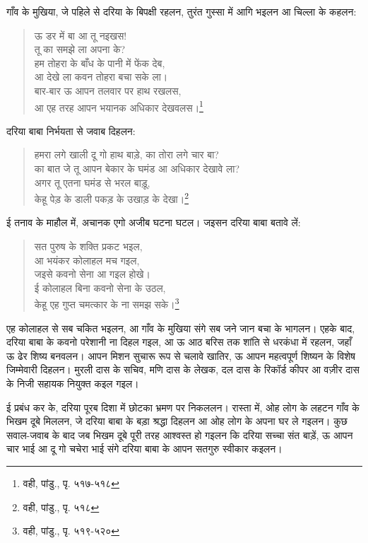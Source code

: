 गाँव के मुखिया, जे पहिले से दरिया के बिपक्षी रहलन, तुरंत गुस्सा में आगि भइलन आ चिल्ला के कहलन:

\begin{quote}
ऊ डर में बा आ तू नइखस! \\
तू का समझे ला अपना के? \\
हम तोहरा के बाँध के पानी में फेंक देब, \\
आ देखे ला कवन तोहरा बचा सके ला। \\
बार-बार ऊ आपन तलवार पर हाथ रखलस, \\
आ एह तरह आपन भयानक अधिकार देखवलस।\footnote{वही, पांडु., पृ. ५१७-५१८}
\end{quote}

दरिया बाबा निर्भयता से जवाब दिहलन:

\begin{quote}
हमरा लगे खाली दू गो हाथ बाड़े, का तोरा लगे चार बा? \\
का बात जे तू आपन बेकार के घमंड आ अधिकार देखावे ला? \\
अगर तू एतना घमंड से भरल बाड़ू, \\
केहू पेड़ के डाली पकड़ के उखाड़ के देखा।\footnote{वही, पांडु., पृ. ५१८}
\end{quote}

ई तनाव के माहौल में, अचानक एगो अजीब घटना घटल। जइसन दरिया बाबा बतावे लें:

\begin{quote}
सत पुरुष के शक्ति प्रकट भइल, \\
आ भयंकर कोलाहल मच गइल, \\
जइसे कवनो सेना आ गइल होखे। \\
ई कोलाहल बिना कवनो सेना के उठल, \\
केहू एह गुप्त चमत्कार के ना समझ सके।\footnote{वही, पांडु., पृ. ५१९-५२०}
\end{quote}

एह कोलाहल से सब चकित भइलन, आ गाँव के मुखिया संगे सब जने जान बचा के भागलन। एहके बाद, दरिया बाबा के कवनो परेशानी ना दिहल गइल, आ ऊ आठ बरिस तक शांति से धरकंधा में रहलन, जहाँ ऊ ढेर शिष्य बनवलन। आपन मिशन सुचारू रूप से चलावे खातिर, ऊ आपन महत्वपूर्ण शिष्यन के विशेष जिम्मेवारी दिहलन। मुरली दास के सचिव, मणि दास के लेखक, दल दास के रिकॉर्ड कीपर आ वज़ीर दास के निजी सहायक नियुक्त कइल गइल।

ई प्रबंध कर के, दरिया पूरब दिशा में छोटका भ्रमण पर निकललन। रास्ता में, ओह लोग के लहटन गाँव के भिखम दूबे मिललन, जे दरिया बाबा के बड़ा श्रद्धा दिहलन आ ओह लोग के अपना घर ले गइलन। कुछ सवाल-जवाब के बाद जब भिखम दूबे पूरी तरह आश्वस्त हो गइलन कि दरिया सच्चा संत बाड़ें, ऊ आपन चार भाई आ दू गो चचेरा भाई संगे दरिया बाबा के आपन सतगुरु स्वीकार कइलन।

